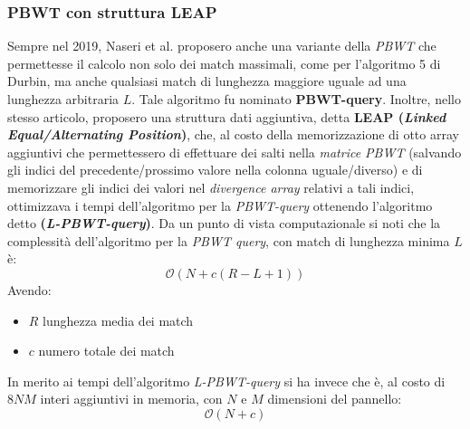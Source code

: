 \subsubsection{PBWT con struttura LEAP}
Sempre nel 2019, Naseri et al.\cite{leap} proposero anche una variante della
\textit{PBWT} 
che permettesse il calcolo non solo dei match massimali, come per l'algoritmo 5
di Durbin, ma anche qualsiasi match di lunghezza maggiore uguale ad una
lunghezza arbitraria $L$. Tale algoritmo fu nominato
\textbf{PBWT-query}. Inoltre, nello 
stesso articolo, proposero 
una struttura dati aggiuntiva, detta \textbf{LEAP (\textit{Linked
    Equal/Alternating Position})}, che, al costo della 
memorizzazione di otto array aggiuntivi che permettessero di effettuare dei
salti nella \textit{matrice PBWT} (salvando gli indici del precedente/prossimo
valore nella colonna uguale/diverso) e di memorizzare gli indici dei valori
nel \textit{divergence array} relativi a tali indici, ottimizzava i tempi
dell'algoritmo per la \textit{PBWT-query} ottenendo l'algoritmo detto
\textbf{(\textit{L-PBWT-query})}.
Da un punto di vista computazionale si noti che la complessità dell'algoritmo
per la \textit{\textit{PBWT query}}, con match di lunghezza minima $L$ è:
\begin{equation}
  \label{eq:leap1}
  \mathcal{O}(N+c(R-L+1))
\end{equation}
Avendo:
\begin{itemize}
  \item $R$ lunghezza media dei match
  \item $c$ numero totale dei match
\end{itemize}
In merito ai tempi dell'algoritmo \textit{L-PBWT-query} si ha invece che è, al
costo di $8NM$ interi aggiuntivi in memoria, con $N$ e $M$ dimensioni del
pannello: 
\begin{equation}
  \label{eq:leap2}
  \mathcal{O}(N+c)
\end{equation}
